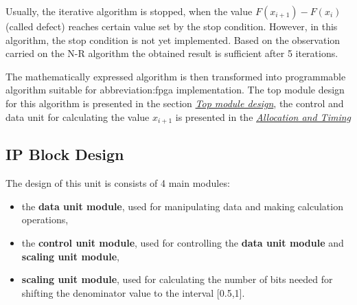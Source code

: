\documentclass[a4paper, twoside, 11pt]{article}
\begin{document}
Usually, the iterative algorithm is stopped, when the value $F(x_{i+1}) - F(x_i)$ (called defect) reaches certain value set by the stop condition. However, in this algorithm, the stop condition is not yet implemented. Based on the observation carried on the N-R algorithm the obtained result is sufficient after 5 iterations.

The mathematically expressed algorithm is then transformed into programmable algorithm suitable for \gls{abbreviation:fpga} implementation. The top module design for this algorithm is presented in the section \hyperref[subsubsec:division-top-module-design]{\textit{Top module design}}, the control and data unit for calculating the value $x_{i+1}$ is presented in the \hyperref[subsubsec:division-allocation-and-timing]{\textit{Allocation and Timing}}

\subsection{IP Block Design}\label{subsec:division-ip-block-design}
The design of this unit is consists of 4 main modules:
\begin{itemize}
  \item the \textbf{data unit module}, used for manipulating data and making calculation operations,
  \item the \textbf{control unit module}, used for controlling the \textbf{data unit module} and \textbf{scaling unit module},
  \item \textbf{scaling unit module}, used for calculating the number of bits needed for shifting the denominator value to the interval [0.5,1].
\end{itemize}
\end{document}
